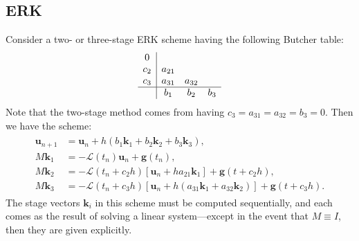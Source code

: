 \documentclass[a4paper,12pt]{article}
\begin{document}
\subsection{ERK}
Consider a two- or three-stage ERK scheme having the following Butcher table:
\begin{align}
\begin{array}
{c|ccc}
0 & \\
c_2 & a_{21} & \\
c_3 & a_{31} & a_{32} & \\
\hline
&b_1 & b_2 & b_3
\end{array}
\end{align}
Note that the two-stage method comes from having $c_3 = a_{31} = a_{32} = b_{3} = 0$.
Then we have the scheme:
\begin{align}
\begin{split}
\mathbf{u}_{n+1} &= \mathbf{u}_{n} + h(b_1 \mathbf{k}_1 + b_2 \mathbf{k}_2 + b_3 \mathbf{k}_3), \\
M \mathbf{k}_1 &= -\mathcal{L}(t_n) \mathbf{u}_n + \mathbf{g}(t_n), \\
M \mathbf{k}_2 &= -\mathcal{L}(t_n + c_2 h) [ \mathbf{u}_n + h a_{21} \mathbf{k}_1 ] + \mathbf{g}(t + c_2 h), \\
M \mathbf{k}_3 &= -\mathcal{L}(t_n + c_3 h) [ \mathbf{u}_n + h(a_{31} \mathbf{k}_1 + a_{32} \mathbf{k}_2) ] + \mathbf{g}(t + c_3 h).
\end{split}
\end{align}
The stage vectors $\mathbf{k}_i$ in this scheme must be computed sequentially, and each comes as the result of solving a linear system---except in the event that $M \equiv I$, then they are given explicitly.
\end{document}
